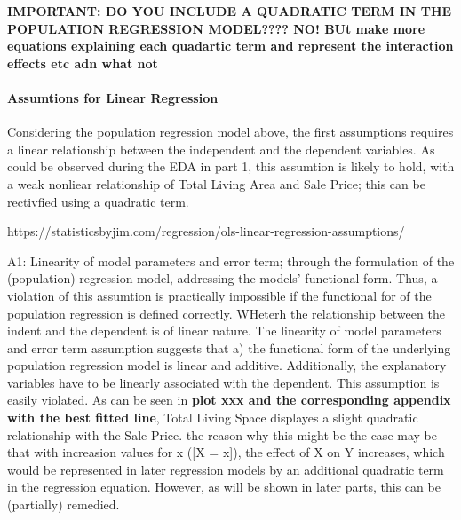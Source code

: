 \documentclass{article}
\begin{document}
\textbf{IMPORTANT: DO YOU INCLUDE A QUADRATIC TERM IN THE POPULATION REGRESSION MODEL???? NO! BUt make more equations explaining each quadartic term and represent the interaction effects etc adn what not }






\indent \paragraph{Assumtions for Linear Regression} Considering the population regression model above, the first assumptions requires a linear relationship between the independent and the dependent variables. As could be observed during the EDA in part 1, this assumtion is likely to hold, with a weak nonliear relationship of Total Living Area and Sale Price; this can be rectivfied using a quadratic term. 

https://statisticsbyjim.com/regression/ols-linear-regression-assumptions/

A1: Linearity of model parameters and error term; through the formulation of the (population) regression model, addressing the models' functional form. Thus, a violation of this assumtion is practically impossible if the functional for of the population regression is defined correctly. WHeterh the relationship between the indent and the dependent is of linear nature.
The linearity of model parameters and error term assumption suggests that a) the functional form of the underlying population regression model is linear and additive. Additionally, the explanatory variables have to be linearly associated with the dependent. This assumption is easily violated. As can be seen in \textbf{plot xxx and the corresponding appendix with the best fitted line}, Total Living Space displayes a slight quadratic relationship with the Sale Price. the reason why this might be the case may be that with increasion values for x ([X = x]), the effect of X on Y increases, which would be represented in later regression models by an additional quadratic term in the regression equation. However, as will be shown in later parts, this can be (partially) remedied.
\end{document}
